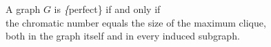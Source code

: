 \documentclass[preview]{standalone}
\begin{document}
\begin{center}
A graph $G$ is \textit\{perfect\} if and only if\\the chromatic number equals the size of the maximum clique,\\both in the graph itself and in every induced subgraph.
\end{center}
\end{document}
